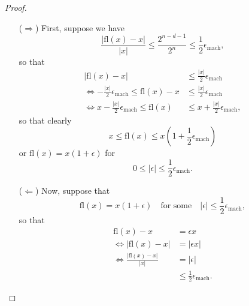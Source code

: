 
\begin{proof}
    \begin{itemize}
        \item[($\Rightarrow$)]
            First, suppose we have
            \[
                \frac{\lvert \text{fl}(x) - x \rvert}{\lvert x \rvert}
                \leq \frac{2^{n-d-1}}{2^n} \leq \frac{1}{2}\epsilon_{\text{mach}},
            \]
            so that
            \begin{equation*}
                \begin{split}
                    \lvert \text{fl}(x) - x \rvert &\leq \frac{\lvert x \rvert}{2}
                    \epsilon_{\text{mach}} \\
                    \Leftrightarrow -\frac{\lvert x \rvert}{2}\epsilon_{\text{mach}}
                    \leq \text{fl}(x) - x &\leq \frac{\lvert x \rvert}{2}
                    \epsilon_{\text{mach}} \\
                    \Leftrightarrow x - \frac{\lvert x \rvert}{2}\epsilon_{\text{mach}}
                    \leq \text{fl}(x) &\leq x + \frac{\lvert x \rvert}{2}
                    \epsilon_{\text{mach}},
                \end{split}
            \end{equation*}
            so that clearly
            \[
                x \leq \text{fl}(x) 
                \leq x\left(1 + \frac{1}{2}\epsilon_{\text{mach}}\right)
            \]
            or $\text{fl}(x) = x(1 + \epsilon)$
            for
            \[
                0 \leq \lvert \epsilon \rvert \leq \frac{1}{2}\epsilon_{\text{mach}}.
            \]
        \item[($\Leftarrow$)]
            Now, suppose that
            \[
                \text{fl}(x) = x(1 + \epsilon) \quad \text{for some} \quad 
                \lvert \epsilon \rvert \leq \frac{1}{2}\epsilon_{\text{mach}},
            \]
            so that
            \begin{equation*}
                \begin{split}
                    \text{fl}(x) - x &= \epsilon x\\
                    \Leftrightarrow \lvert \text{fl}(x) - x \rvert 
                                     &= \lvert \epsilon x \rvert \\
                    \Leftrightarrow \frac{\lvert \text{fl}(x) - x\rvert}{\lvert x \rvert}
                                     &= \lvert \epsilon \rvert \\
                                     &\leq \frac{1}{2}\epsilon_{\text{mach}}.
                \end{split} 
            \end{equation*}
    \end{itemize}
\end{proof}
